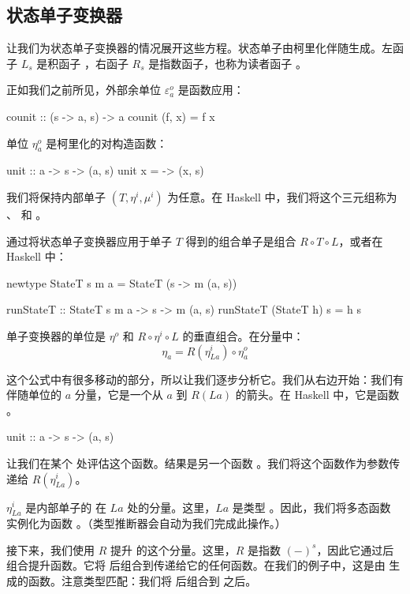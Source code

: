 \documentclass[DaoFP]{subfiles}
\begin{document}
\subsection{状态单子变换器}

让我们为状态单子变换器的情况展开这些方程。状态单子由柯里化伴随生成。左函子 $L_s$ 是积函子 ，右函子 $R_s$ 是指数函子，也称为读者函子 。

正如我们之前所见，外部余单位 $\varepsilon^o_a$ 是函数应用：
\begin{haskell}
counit :: (s -> a, s) -> a
counit (f, x) = f x
\end{haskell}
单位 $\eta^o_a$ 是柯里化的对构造函数：
\begin{haskell}
unit :: a -> s -> (a, s)
unit x = \s -> (x, s)
\end{haskell}

我们将保持内部单子 $(T, \eta^i, \mu^i)$ 为任意。在 Haskell 中，我们将这个三元组称为 、 和 。

通过将状态单子变换器应用于单子 $T$ 得到的组合单子是组合 $R \circ T \circ L$，或者在 Haskell 中：
\begin{haskell}
newtype StateT s m a = StateT (s -> m (a, s))
\end{haskell}

\begin{haskell}
runStateT :: StateT s m a -> s -> m (a, s)
runStateT (StateT h) s = h s
\end{haskell}

单子变换器的单位是 $\eta^o$ 和 $R \circ \eta^i \circ L$ 的垂直组合。在分量中：
\[ \eta_a = R(\eta^i_{L a}) \circ \eta^o_a \]

这个公式中有很多移动的部分，所以让我们逐步分析它。我们从右边开始：我们有伴随单位的 $a$ 分量，它是一个从 $a$ 到 $R (L a)$ 的箭头。在 Haskell 中，它是函数 。
\begin{haskell}
unit :: a -> s -> (a, s)
\end{haskell}
让我们在某个  处评估这个函数。结果是另一个函数 。我们将这个函数作为参数传递给 $R(\eta^i_{L a})$。

$\eta^i_{L a}$ 是内部单子的  在 $L a$ 处的分量。这里，$L a$ 是类型 。因此，我们将多态函数  实例化为函数 。（类型推断器会自动为我们完成此操作。）

接下来，我们使用 $R$ 提升  的这个分量。这里，$R$ 是指数 $(-)^s$，因此它通过后组合提升函数。它将  后组合到传递给它的任何函数。在我们的例子中，这是由  生成的函数。注意类型匹配：我们将  后组合到  之后。
\end{document}
